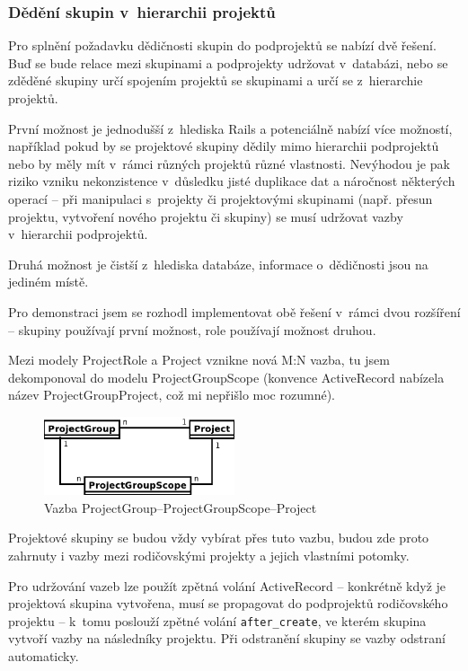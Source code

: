 \documentclass[thesis=B,czech]{FITthesis}[2012/05/02]
\begin{document}
\subsubsection{Dědění skupin v~hierarchii projektů}
\label{sec:proj_group_inherit}

Pro splnění požadavku dědičnosti skupin do podprojektů se nabízí dvě
řešení. Buď se bude relace mezi skupinami a podprojekty udržovat
v~databázi, nebo se zděděné skupiny určí spojením projektů se skupinami a
určí se z~hierarchie projektů.

První možnost je jednodušší z~hlediska Rails a potenciálně nabízí více
možností, například pokud by se projektové skupiny dědily mimo
hierarchii podprojektů nebo by měly mít v~rámci různých projektů různé
vlastnosti. Nevýhodou je pak riziko vzniku nekonzistence v~důsledku
jisté duplikace dat a náročnost některých operací -- při manipulaci
s~projekty či projektovými skupinami (např. přesun projektu, vytvoření
nového projektu či skupiny) se musí udržovat vazby v~hierarchii
podprojektů.

Druhá možnost je čistší z~hlediska databáze, informace o~dědičnosti jsou
na jediném místě.

Pro demonstraci jsem se rozhodl implementovat obě řešení v~rámci dvou
rozšíření -- skupiny používají první možnost, role používají možnost
druhou.

Mezi modely ProjectRole a Project vznikne nová M:N vazba, tu jsem
dekomponoval do modelu ProjectGroupScope (konvence ActiveRecord nabízela
název ProjectGroupProject, což mi nepřišlo moc rozumné).

\begin{figure}[htbp]
\centering
\includegraphics[width=0.5\textwidth]{group-er4.pdf}
\caption{Vazba ProjectGroup--ProjectGroupScope--Project}
\end{figure}

Projektové skupiny se budou vždy vybírat přes tuto vazbu, budou zde
proto zahrnuty i vazby mezi rodičovskými projekty a jejich vlastními
potomky.

Pro udržování vazeb lze použít zpětná volání ActiveRecord -- konkrétně
když je projektová skupina vytvořena, musí se propagovat do podprojektů
rodičovského projektu -- k~tomu poslouží zpětné volání
\lstinline!after_create!, ve kterém skupina vytvoří vazby na následníky
projektu. Při odstranění skupiny se vazby odstraní automaticky.
\end{document}
